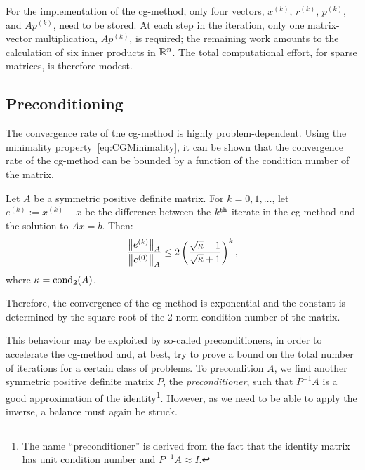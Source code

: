 For the implementation of the cg-method, only four vectors, $x^{(k)}$, $r^{(k)}$, $p^{(k)}$, and $Ap^{(k)}$, need to be stored. At each step in the iteration, only one matrix-vector multiplication, $Ap^{(k)}$, is required; the remaining work amounts to the calculation of six inner products in $\mathbb{R}^n$. The total computational effort, for sparse matrices, is therefore modest.

\subsection{Preconditioning}

The convergence rate of the cg-method is highly problem-dependent. Using the minimality property~\eqref{eq:CGMinimality}, it can be shown that the convergence rate of the cg-method can be bounded by a function of the condition number of the matrix.

\begin{theorem}
Let $A$ be a symmetric positive definite matrix. For $k=0,1,\ldots$, let $e^{(k)}:=x^{(k)}-x$ be the difference between the $k^{\rm th}$ iterate in the cg-method and the solution to $Ax=b$. Then:
\[
\dfrac{\left\|{e^{(k)}}\right\|_A}{\left\|{e^{(0)}}\right\|_A} \le 2\left(\dfrac{\sqrt{\kappa}-1}{\sqrt{\kappa}+1}\right)^k,
\]
where $\kappa = \operatorname{cond}_2(A)$.
\end{theorem}
Therefore, the convergence of the cg-method is exponential and the constant is determined by the square-root of the $2$-norm condition number of the matrix.

This behaviour may be exploited by so-called preconditioners, in order to accelerate the cg-method and, at best, try to prove a bound on the total number of iterations for a certain class of problems. To precondition $A$, we find another symmetric positive definite matrix $P$, the {\em preconditioner}, such that $P^{-1}A$ is a good approximation of the identity\footnote{The name ``preconditioner'' is derived from the fact that the identity matrix has unit condition number and $P^{-1}A\approx I$.}. However, as we need to be able to apply the inverse, a balance must again be struck.

